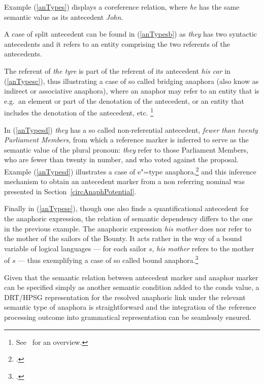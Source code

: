 \documentclass[output=paper
,modfonts
,nonflat]{langsci/langscibook}
\begin{document}
 Example (\ref{anTypes}) displays a coreference relation, where {\it he} has the same semantic value as its antecedent {\it John}. 
 
 A case of split antecedent can be found in (\ref{anTypesb}) as {\it they} has two syntactic antecedents and it refers to an entity comprising the two referents of the antecedents. 
 
 The referent of {\it the tyre} is part of the referent of its antecedent {\it his car} in (\ref{anTypesc}), 
 thus illustrating a case of so called bridging anaphora (also know as indirect or associative anaphora),
where an anaphor may refer to an entity that is e.g.\ an element or part 
of the denotation of the antecedent, or an entity that includes the denotation
of the antecedent, etc.%
\footnote{
See~\citep{poesio:ana98} for an overview.
}
% 

In (\ref{anTypesd}) {\it they} has 
a so called non-referential antecedent, {\it fewer than twenty Parliament Members}, 
from which a reference marker is inferred to serve as the semantic value of the plural pronoun: 
{\it they} refer to those Parliament Members, who are fewer than twenty in number, and who voted against the proposal.
 Example (\ref{anTypesd}) illustrates a case of e"=type anaphora,\footnote{
\citep{evans:pron80}.} and this inference mechanism to obtain an antecedent marker
from a non referring nominal was presented in Section~\ref{circAnaphPotential}. 

 Finally in (\ref{anTypese}), though one also finds a quantificational antecedent for the anaphoric expression, the relation of semantic dependency differs to the one in the previous example. The anaphoric expression {\it his mother} does nor refer to the mother of the sailors of the Bounty. It acts rather in the way of a bound variable of logical languages --- for each sailor $s$, {\it his mother} refers to the mother of $s$ --- thus exemplifying a case of so called bound anaphora.\footnote{
\citep{reinhart:bound83}.
}


Given that the semantic relation between antecedent marker and anaphor marker 
can be specified simply as another semantic condition added to the
{\sc conds} value, a DRT/HPSG representation for the resolved anaphoric
link under the relevant semantic type of anaphora is straightforward and the integration 
of the reference processing outcome into grammatical representation can be seamlessly ensured.
\end{document}
